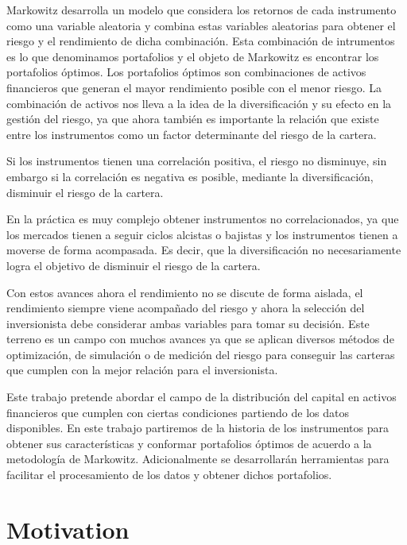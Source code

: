 \documentclass[
  12pt,
]{krantz}
\begin{document}
Markowitz desarrolla un modelo que considera los retornos de cada instrumento como una variable aleatoria y combina estas variables aleatorias para obtener el riesgo y el rendimiento de dicha combinación. Esta combinación de intrumentos es lo que denominamos portafolios y el objeto de Markowitz es encontrar los portafolios óptimos. Los portafolios óptimos son combinaciones de activos financieros que generan el mayor rendimiento posible con el menor riesgo. La combinación de activos nos lleva a la idea de la diversificación y su efecto en la gestión del riesgo, ya que ahora también es importante la relación que existe entre los instrumentos como un factor determinante del riesgo de la cartera.

Si los instrumentos tienen una correlación positiva, el riesgo no disminuye, sin embargo si la correlación es negativa es posible, mediante la diversificación, disminuir el riesgo de la cartera.

En la práctica es muy complejo obtener instrumentos no correlacionados, ya que los mercados tienen a seguir ciclos alcistas o bajistas y los instrumentos tienen a moverse de forma acompasada. Es decir, que la diversificación no necesariamente logra el objetivo de disminuir el riesgo de la cartera.

Con estos avances ahora el rendimiento no se discute de forma aislada, el rendimiento siempre viene acompañado del riesgo y ahora la selección del inversionista debe considerar ambas variables para tomar su decisión. Este terreno es un campo con muchos avances ya que se aplican diversos métodos de optimización, de simulación o de medición del riesgo para conseguir las carteras que cumplen con la mejor relación para el inversionista.

Este trabajo pretende abordar el campo de la distribución del capital en activos financieros que cumplen con ciertas condiciones partiendo de los datos disponibles. En este trabajo partiremos de la historia de los instrumentos para obtener sus características y conformar portafolios óptimos de acuerdo a la metodología de Markowitz. Adicionalmente se desarrollarán herramientas para facilitar el procesamiento de los datos y obtener dichos portafolios.

\hypertarget{motivation}{%
\section{Motivation}\label{motivation}}
\end{document}
